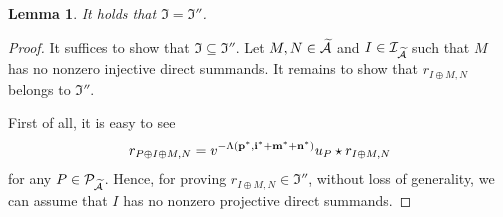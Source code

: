 \documentclass[reqno,12pt]{amsart}
\numberwithin{equation}{section}
\theoremstyle{plain} %
\newtheorem{lemma}[theorem]{\bf Lemma}
\theoremstyle{definition} %
\begin{document}
\begin{lemma}\label{dlxdjkh}
It holds that $\mathfrak{I}={\mathfrak{I}''}$.
\end{lemma}
\begin{proof}
It suffices to show that $\mathfrak{I}\subseteq \mathfrak{I}''$. Let $M,N\in \widetilde{\mathcal{A}}$ and $I\in \mathcal{I}_{\widetilde{\mathcal{A}}}$ such that $M$ has no nonzero injective direct summands. It remains to show that $r_{I\oplus M,N}$ belongs to $\mathfrak{I}''$.

First of all, it is easy to see
$$r_{P\oplus I\oplus M,N}=v^{-\Lambda({\bf p}^\ast,{\bf i}^\ast+{\bf m}^\ast+{\bf n}^\ast)}u_P\star r_{I\oplus M,N}$$ for any $P\in \mathcal{P}_{\widetilde{\mathcal{A}}}$.
Hence, for proving $r_{I\oplus M,N}\in\mathfrak{I}''$, without loss of generality, we can assume that $I$ has no nonzero projective direct summands.


\end{proof}
\end{document}
